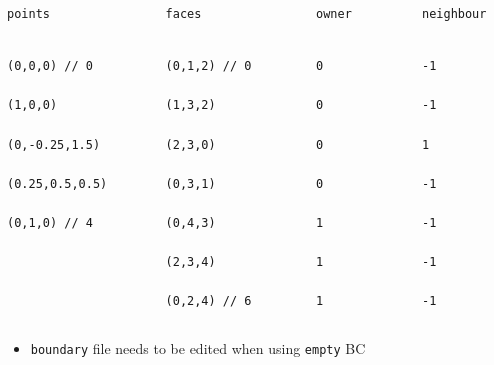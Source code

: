 {\begin{frame}[fragile]
\begin{figure}
        \end{figure}
        \begin{columns}[T]
            \begin{column}{0.25\linewidth}
                \texttt{points}
                \begin{verbatim}
                    (0,0,0) // 0
                    (1,0,0)
                    (0,-0.25,1.5)
                    (0.25,0.5,0.5)
                    (0,1,0) // 4
                \end{verbatim}
            \end{column}
            \begin{column}{0.25\linewidth}
                \texttt{faces}
                \begin{verbatim}
                    (0,1,2) // 0
                    (1,3,2)
                    (2,3,0)
                    (0,3,1)
                    (0,4,3)
                    (2,3,4)
                    (0,2,4) // 6
                \end{verbatim}
            \end{column}
            \begin{column}{0.25\linewidth}
                \texttt{owner}
                \begin{verbatim}
                    0
                    0
                    0
                    0
                    1
                    1
                    1
                \end{verbatim}
            \end{column}
            \begin{column}{0.25\linewidth}
                \texttt{neighbour}
                \begin{verbatim}
                    -1
                    -1
                    1
                    -1
                    -1
                    -1
                    -1
                \end{verbatim}
            \end{column}
        \end{columns}
        \vspace{1em}
        \begin{itemize}
            \item \texttt{boundary} file needs to be edited when using \texttt{empty} BC
        \end{itemize}
    \end{frame}
}

